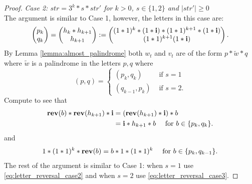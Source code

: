 \documentclass[12pt]{amsart}
\begin{document}
\begin{proof}
	
	{\it Case 2:  $str = 3^k*s*str'$ for $k > 0$, $s \in \{1,2\}$ and $|str'|\geq 0$} \\	
	The argument is similar to Case 1, however, the letters in this case are: 
	\[
	\begin{pmatrix}
	p_k \\
	q_k
	\end{pmatrix} 
	= 
	\begin{pmatrix}
	h_k*h_{k+1} \\
	h_{k+1}
	\end{pmatrix}
	:= 
	\begin{pmatrix}(1*1)^k*(1*\mathbf{i})*(1*1)^{k+1}*(1*\mathbf{i})  \\
	(1*1)^{k+1}(1*\mathbf{i})
	\end{pmatrix}.
	\]
	By Lemma \ref{lemma:almost_palindrome} both $w_t$ and $v_t$ are of the form $p*\tilde{w}*q$ where $\tilde{w}$ is a palindrome in the letters $p,q$ where 
	\[
	(p,q) = \begin{cases} (p_k, q_k) &\mbox{ if $s = 1$} \\
	(q_{k-1}, p_k) &\mbox{ if $s = 2$}.
	\end{cases}
	\]
	Compute to see that
	\begin{equation}\label{eq:letter_reversal_case2}
	\begin{aligned}
	\mathop{\bf rev}(b)*\mathop{\bf rev}(h_{k+1})*\mathbf{i} &= (\mathop{\bf rev}(h_{k+1})*\mathbf{i})*b  \\
	&= \mathbf{i}*h_{k+1}*b \quad \mbox{ for $b \in \{p_k,q_k\}$}.
	\end{aligned}
	\end{equation}
	and
	\begin{equation}\label{eq:letter_reversal_case3}
	1*(1*1)^k*\mathop{\bf rev}(b) = b*	1*(1*1)^k  \quad \mbox{ for $b \in \{p_k,q_{k-1}\}$}.
	\end{equation}
	The rest of the argument is similar to Case 1: when $s = 1$ use \eqref{eq:letter_reversal_case2}
	and when $s = 2$ use \eqref{eq:letter_reversal_case3}. 
%	
%


\end{proof}
\end{document}
